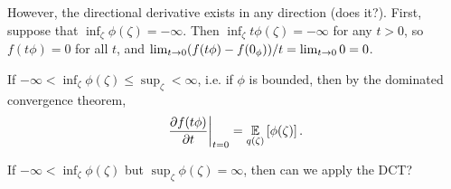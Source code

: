 \begin{ex}
However, the directional derivative exists in any direction (does it?). First,
suppose that $\inf_{\zeta} \phi(\zeta) = -\infty$.  Then $\inf_{\zeta} t
\phi(\zeta) = -\infty$ for any $t > 0$, so $f(t\phi) = 0$ for all $t$, and
$\lim_{t \rightarrow 0} (f(t \phi) - f(0_\phi)) / t = \lim_{t \rightarrow 0} 0 =
0$.

If $-\infty < \inf_\zeta \phi(\zeta) \le \sup_\zeta < \infty$, i.e.
if $\phi$ is bounded, then by the dominated convergence theorem,
%
\begin{align*}
%
\fracat{\partial f(t \phi)}{\partial t}{t=0} =
    \expect{q(\zeta)}{\phi(\zeta)}.
%
\end{align*}
%

If $-\infty < \inf_\zeta \phi(\zeta)$ but $\sup_\zeta \phi(\zeta) = \infty$,
then can we apply the DCT?
%




\end{ex}
